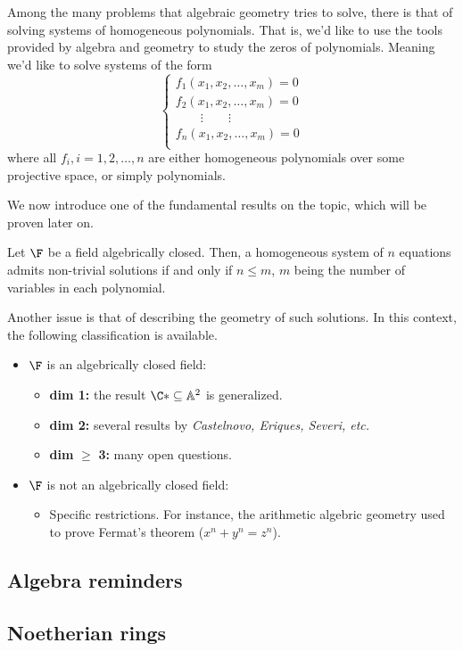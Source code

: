 \documentclass{subfiles}
\begin{document}
    Among the many problems that algebraic geometry tries to solve,
        there is that of solving systems of homogeneous polynomials.
        That is, we'd like to use the tools provided by algebra and geometry 
        to study the zeros of polynomials. 
        Meaning we'd like to solve systems of the form 
        \[
            \begin{cases}
                f_{1} (x_{1}, x_{2}, \ldots, x_{m})  = 0 \\ 
                f_{2} (x_{1}, x_{2}, \ldots, x_{m})  = 0 \\
                \qquad \vdots \qquad \vdots \\ 
                f_{n} (x_{1}, x_{2}, \ldots, x_{m})  = 0 \\ 
            \end{cases}
        \]
        where all \(f_{i}, i = 1, 2, \ldots, n\) are either homogeneous polynomials
        over some projective space, or simply polynomials.

    We now introduce one of the fundamental results on the topic,
        which will be proven later on. 

    \begin{theorem}
        Let \(\F\) be a field algebrically closed. Then, a homogeneous system 
            of \(n\) equations admits non-trivial solutions if and only if 
            \(n \le m\), \(m\) being the number of variables in each polynomial.        
    \end{theorem}

    Another issue is that of describing the geometry of such solutions.
        In this context, the following classification is available.
        \begin{itemize}
            \item \(\F\) is an algebrically closed field: 
                \begin{itemize}
                    \item \textbf{dim 1:} the result \(\C* \subseteq \mathbb{A}^{2}\) is 
                        generalized. 
                    \item \textbf{dim 2:} several results by \emph{Castelnovo, Eriques, Severi, etc.}
                    \item \textbf{dim} \(\boldsymbol{\ge}\) \textbf{3:} many open questions.
                \end{itemize}

            \item \(\F\) is not an algebrically closed field:
                \begin{itemize}
                    \item Specific restrictions. For instance, the arithmetic algebric geometry 
                        used to prove Fermat's theorem (\(x^{n} + y^{n} = z^{n}\)).
                \end{itemize}
        \end{itemize}

    \subsection{Algebra reminders}
    

    \subsection{Noetherian rings}
    
    \clearpage
\end{document}
